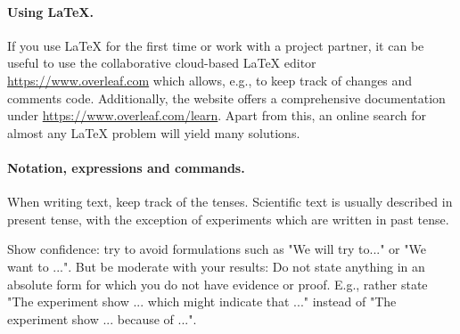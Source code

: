\documentclass[a4paper,11pt]{article}
\theoremstyle{definition}
\begin{document}
\paragraph{Using \LaTeX{}.}
If you use \LaTeX{} for the first time or work with a project partner, it can be useful to use the collaborative cloud-based \LaTeX{} editor \url{https://www.overleaf.com} which allows, e.g., to keep track of changes and comments code. Additionally, the website offers a comprehensive documentation under \url{https://www.overleaf.com/learn}.
Apart from this, an online search for almost any \LaTeX{} problem will yield many solutions.

\paragraph{Notation, expressions and commands.}
When writing text, keep track of the tenses. Scientific text is usually described in present tense, with the exception of experiments which are written in past tense.

Show confidence: try to avoid formulations such as "We will try to..." or "We want to ...". But be moderate with your results: Do not state anything in an absolute form for which you do not have evidence or proof. E.g., rather state "The experiment show ... which might indicate that ..." instead of "The experiment show ... because of ...".
\end{document}
